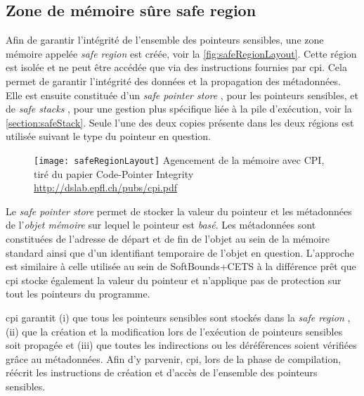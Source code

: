 \subsection{Zone de mémoire sûre \og safe region \fg}

Afin de garantir l'intégrité de l'ensemble des pointeurs sensibles, une zone mémoire appelée \og \textit{safe region} \fg est créée, voir la \autoref{fig:safeRegionLayout}. Cette région est isolée et ne peut être accédée que via des instructions fournies par \gls{cpi}. Cela permet de garantir l'intégrité des données et la propagation des métadonnées. Elle est ensuite constituée d'un \og \textit{safe pointer store} \fg, pour les pointeurs sensibles, et de \og \textit{safe stacks} \fg, pour une gestion plus spécifique liée à la pile d'exécution, voir la \autoref{section:safeStack}. Seule l'une des deux copies présente dans les deux régions est utilisée suivant le type du pointeur en question.

\begin{figure}[H]
	\centering
	\texttt{[image: safeRegionLayout]}
	{Agencement de la mémoire avec CPI, tiré du papier Code-Pointer Integrity}
	{\url{http://dslab.epfl.ch/pubs/cpi.pdf}}
	\label{fig:safeRegionLayout}
\end{figure}

Le \textit{safe pointer store} permet de stocker la valeur du pointeur et les métadonnées de l'\textit{objet mémoire} sur lequel le pointeur est \textit{basé}. Les métadonnées sont constituées de l'adresse de départ et de fin de l'objet au sein de la mémoire standard ainsi que d'un identifiant temporaire de l'objet en question. L'approche est similaire à celle utilisée au sein de SoftBounds+CETS \cite{SoftBound} à la différence prêt que \gls{cpi} stocke également la valeur du pointeur et n'applique pas de protection sur tout les pointeurs du programme.

\gls{cpi} garantit (i) que tous les pointeurs sensibles sont stockés dans la \og \textit{safe region} \fg, (ii) que la création et la modification lors de l'exécution de pointeurs sensibles soit propagée et (iii) que toutes les indirections ou les déréférences soient vérifiées grâce au métadonnées. Afin d'y parvenir, \gls{cpi}, lors de la phase de compilation, réécrit les instructions de création et d'accès de l'ensemble des pointeurs sensibles.


